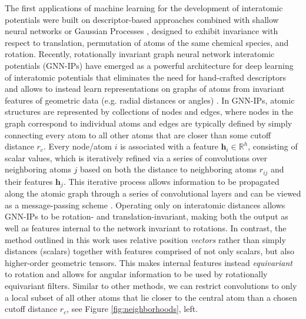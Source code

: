 \documentclass[11pt]{article}
\providecommand{\mathds}{\mathbb}%
\begin{document}
The first applications of machine learning for the development of interatomic potentials were built on descriptor-based approaches combined with shallow neural networks or Gaussian Processes \cite{behler2007generalized, gaporiginalpaper}, designed to exhibit invariance with respect to translation, permutation of atoms of the same chemical species, and rotation. Recently, rotationally invariant graph neural network interatomic potentials (GNN-IPs) have emerged as a powerful architecture for deep learning of interatomic potentials that eliminates the need for hand-crafted descriptors and allows to instead learn representations on graphs of atoms from invariant features of geometric data (e.g. radial distances or angles) \cite{schnet_neurips, physnet_jctc, gnnff, klicpera2020directional}. In GNN-IPs, atomic structures are represented by collections of nodes and edges, where nodes in the graph correspond to individual atoms and edges are typically defined by simply connecting every atom to all other atoms that are closer than some cutoff distance $r_c$. Every node/atom $i$ is associated with a feature $\mathbf{h}_i \in \mathds{R}^{h}$, consisting of scalar values, which is iteratively refined via a series of convolutions over neighboring atoms $j$ based on both the distance to neighboring atoms $r_{ij}$ and their features $\mathbf{h}_j$. This iterative process allows information to be propagated along the atomic graph through a series of convolutional layers and can be viewed as a message-passing scheme \cite{gilmer2017neural}. Operating only on interatomic distances allows GNN-IPs to be rotation- and translation-invariant, making both the output as well as features internal to the network invariant to rotations. In contrast, the method outlined in this work uses relative position \textit{vectors} rather than simply distances (scalars) together with features comprised of not only scalars, but also higher-order geometric tensors. This makes internal features instead \textit{equivariant} to rotation and allows for angular information to be used by rotationally equivariant filters. Similar to other methods, we can restrict convolutions to only a local subset of all other atoms that lie closer to the central atom than a chosen cutoff distance $r_c$, see Figure \ref{fig:neighborhoods}, left.\\ 
\end{document}
